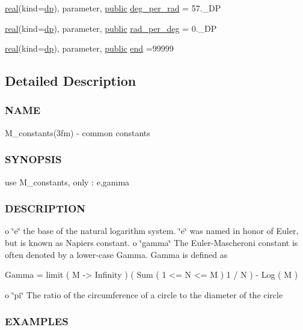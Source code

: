 \begin{DoxyCompactItemize}
\item 
\hyperlink{read__watch_83_8txt_abdb62bde002f38ef75f810d3a905a823}{real}(kind=\hyperlink{namespacem__constants_a15743b6f1a6f57ab5b842d79fbffdd98}{dp}), parameter, \hyperlink{M__stopwatch_83_8txt_a2f74811300c361e53b430611a7d1769f}{public} \hyperlink{namespacem__constants_ac3ff54a4212c8fd52f7a560c143beb13}{deg\+\_\+per\+\_\+rad} = 57.\+\_\+\+DP
\item 
\hyperlink{read__watch_83_8txt_abdb62bde002f38ef75f810d3a905a823}{real}(kind=\hyperlink{namespacem__constants_a15743b6f1a6f57ab5b842d79fbffdd98}{dp}), parameter, \hyperlink{M__stopwatch_83_8txt_a2f74811300c361e53b430611a7d1769f}{public} \hyperlink{namespacem__constants_a365f3d8b9c36ceb901d7bc9631a7be0c}{rad\+\_\+per\+\_\+deg} = 0.\+\_\+\+DP
\item 
\hyperlink{read__watch_83_8txt_abdb62bde002f38ef75f810d3a905a823}{real}(kind=\hyperlink{namespacem__constants_a15743b6f1a6f57ab5b842d79fbffdd98}{dp}), parameter, \hyperlink{M__stopwatch_83_8txt_a2f74811300c361e53b430611a7d1769f}{public} \hyperlink{namespacem__constants_a00fa81f5a36d9ea6a2add582ac3b54a6}{end} =99999
\end{DoxyCompactItemize}


\subsection{Detailed Description}
\subsubsection*{N\+A\+ME}

M\+\_\+constants(3fm) -\/ common constants \subsubsection*{S\+Y\+N\+O\+P\+S\+IS}

use M\+\_\+constants, only \+: e,gamma \subsubsection*{D\+E\+S\+C\+R\+I\+P\+T\+I\+ON}

o \char`\"{}e\char`\"{} the base of the natural logarithm system. \char`\"{}e\char`\"{} was named in honor of Euler, but is known as Napier\textquotesingle{}s constant. o \char`\"{}gamma\char`\"{} The Euler-\/\+Mascheroni constant is often denoted by a lower-\/case Gamma. Gamma is defined as \begin{DoxyVerb}         Gamma = limit ( M -> Infinity ) ( Sum ( 1 <= N <= M ) 1 / N ) - Log ( M )
\end{DoxyVerb}
 o \char`\"{}pi\char`\"{} The ratio of the circumference of a circle to the diameter of the circle \subsubsection*{E\+X\+A\+M\+P\+L\+ES}

